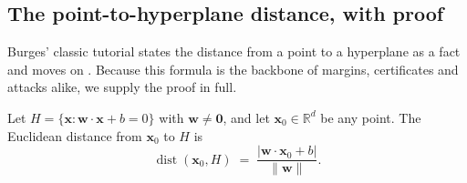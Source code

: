 \subsection{The point-to-hyperplane distance, with proof}

Burges' classic tutorial states the distance from a point to a hyperplane
as a fact and moves on \citep{burges1998}. Because this formula is the
backbone of margins, certificates and attacks alike, we supply the proof
in full.

\begin{theorem}
\label{thm:dist}
Let $H = \{\mathbf{x} : \mathbf{w}\cdot\mathbf{x} + b = 0\}$ with
$\mathbf{w}\neq \mathbf{0}$, and let $\mathbf{x}_0\in\mathbb{R}^d$ be any
point. The Euclidean distance from $\mathbf{x}_0$ to $H$ is
\[
  \operatorname{dist}(\mathbf{x}_0, H)
  \;=\; \frac{|\mathbf{w}\cdot\mathbf{x}_0 + b|}{\|\mathbf{w}\|}.
\]
\end{theorem}

